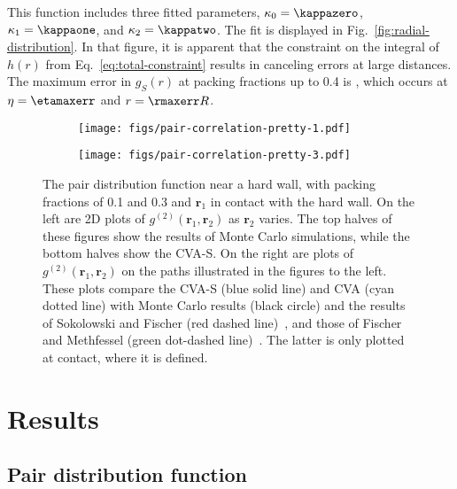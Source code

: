 \documentclass[letterpaper,twocolumn,amsmath,amssymb,pre,aps,10pt]{revtex4-1}
\newcommand{\rr}{\textbf{r}}
\begin{document}
This function includes three fitted parameters, $\kappaO =
\kappazero$, $\kappaI = \kappaone$,
and $\kappaZ = \kappatwo$.
The fit is displayed in Fig.~\ref{fig:radial-distribution}.  In that
figure, it is apparent that the constraint on the integral of $h(r)$ from
Eq.~\ref{eq:total-constraint} results in canceling errors at large
distances.  The maximum error in $g_S(r)$ at packing fractions up to
0.4 is \maxerr, which occurs at $\eta = \etamaxerr$ and $r =
\rmaxerr R$.

\newcommand{\plotcomp}[1]{The top halves of these figures show the
  results of Monte Carlo simulations, while the bottom halves show the
  CVA-S.  On the right are plots of #1 on the paths illustrated in the
  figures to the left.  These plots compare the CVA-S (blue solid line) and CVA
  (cyan dotted line) with Monte Carlo results (black circle)
  and the results of Sokolowski and Fischer
  (red dashed line)~\cite{sokolowski1992role}, and those of Fischer and Methfessel
  (green dot-dashed line)~\cite{fischer1980born}.  The latter is only plotted at
  contact, where it is defined}

\begin{figure*}
  \begin{subfigure}{\textwidth}
    \texttt{[image: figs/pair-correlation-pretty-1.pdf]}
    \vspace{-0.6cm}
  \end{subfigure}
  \begin{subfigure}{\textwidth}
    \texttt{[image: figs/pair-correlation-pretty-3.pdf]}
    \vspace{-0.6cm}
  \end{subfigure}
  \caption{The pair distribution function near a hard wall, with
    packing fractions of 0.1 and 0.3 and $\rr_1$ in contact with the
    hard wall.  On the left are 2D plots of $g^{(2)}(\rr_1,\rr_2)$ as
    $\rr_2$ varies. \plotcomp{$g^{(2)}(\rr_1,\rr_2)$}.}
  \label{fig:pair-distribution}
\end{figure*}

\section{Results}

\subsection{Pair distribution function}

\end{document}
